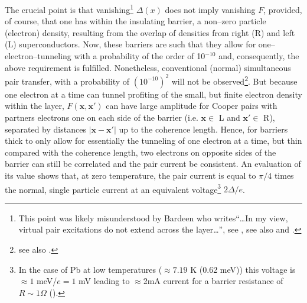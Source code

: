 The crucial point is that vanishing\footnote{This point was likely misunderstood by Bardeen who writes``\dots In my view, virtual pair excitations do not extend across the layer\dots'', see \cite{McDonald:01}, see also \cite{Bardeen:61} and \cite{Bardeen:62}.} $\Delta(x)$ does not imply vanishing $F$, provided, of course, that one has within the insulating barrier, a non--zero particle (electron) density, resulting from the overlap of densities from right (R) and left (L) superconductors. Now, these barriers are such that they allow for one--electron--tunneling with a probability of the order of 10$^{-10}$ and, consequently, the above requirement is fulfilled. Nonetheless, conventional (normal) simultaneous pair transfer, with a probability of $(10^{-10})^2$ will not be observed\footnote{\cite{Pippard:12} see also \cite{McDonald:01}.}. But because one electron at a time can tunnel profiting of the small, but finite electron density within the layer,   $F(\mathbf{x},\mathbf{x}')$ can have large amplitude for Cooper pairs with partners electrons one on each side of the barrier (i.e. $\mathbf x\in$ L and $\mathbf x'\in$ R), separated by distances $|\mathbf{x}-\mathbf{x}'|$ up to the coherence length. Hence, for barriers thick to only allow for essentially the tunneling of one electron at a time, but thin compared with the coherence length, two electrons on opposite sides of the barrier can still be correlated and the pair current   be consistent. An evaluation of its 
value shows that, at zero temperature, the pair current is equal to $\pi/4$ times the normal, single particle current at an equivalent voltage\footnote{In the case of Pb at low temperatures ($\approx7.19$ K (0.62 meV)) this voltage is $\approx 1$ meV/$e=1$ mV leading to $\approx$2mA current for a barrier resistance of $R\sim1\Omega$ (\cite{Ambegaokar:63,McDonald:01,Tinkham:96}).} $2\Delta/e$.


